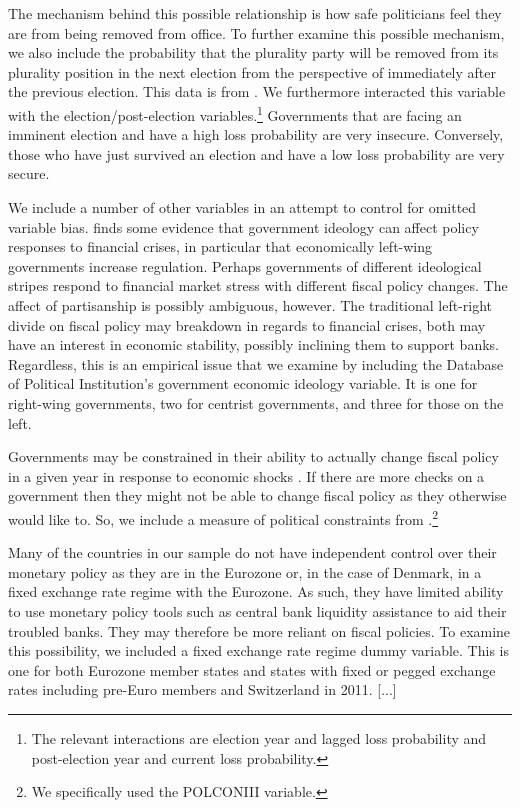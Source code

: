 \documentclass[]{article}
\begin{document}
The mechanism behind this possible relationship is how safe politicians feel they are from being removed from office. To further examine this possible mechanism, we also include the probability that the plurality party will be removed from its plurality position in the next election from the perspective of immediately after the previous election. This data is from \cite{Kayser2015comp}. We furthermore interacted this variable with the election/post-election variables.\footnote{The relevant interactions are election year and lagged loss probability and post-election year and current loss probability.} Governments that are facing an imminent election and have a high loss probability are very insecure. Conversely, those who have just survived an election and have a low loss probability are very secure.

We include a number of other variables in an attempt to control for omitted variable bias. \cite{broz2013} finds some evidence that government ideology can affect policy responses to financial crises, in particular that economically left-wing governments increase regulation. Perhaps governments of different ideological stripes respond to financial market stress with different fiscal policy changes. The affect of partisanship is possibly ambiguous, however. The traditional left-right divide on fiscal policy may breakdown in regards to financial crises, both may have an interest in economic stability, possibly inclining them to support banks. Regardless, this is an empirical issue that we examine by including the Database of Political Institution's \citep[][updated through 2012]{DPI2001} government economic ideology variable. It is one for right-wing governments, two for centrist governments, and three for those on the left.

Governments may be constrained in their ability to actually change fiscal policy in a given year in response to economic shocks \cite[e.g.][]{MacIntyre2001}. If there are more checks on a government then they might not be able to change fiscal policy as they otherwise would like to. So, we include a measure of political constraints from \cite[][updated through 2011]{Henisz2004}.\footnote{We specifically used the POLCONIII variable.}

Many of the countries in our sample do not have independent control over their monetary policy as they are in the Eurozone or, in the case of Denmark, in a fixed exchange rate regime with the Eurozone. As such, they have limited ability to use monetary policy tools such as central bank liquidity assistance to aid their troubled banks. They may therefore be more reliant on fiscal policies. To examine this possibility, we included a fixed exchange rate regime dummy variable. This is one for both Eurozone member states and states with fixed or pegged exchange rates including pre-Euro members and Switzerland in 2011.  
[...]
\end{document}
